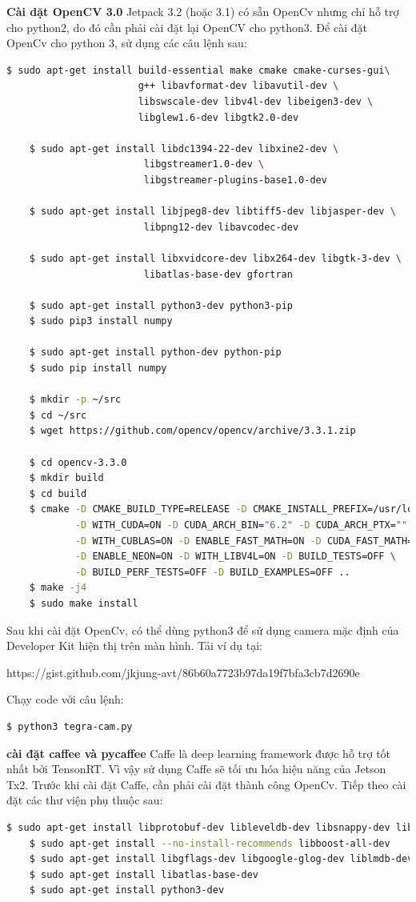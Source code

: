 \documentclass[a4paper]{report}
\begin{document}
\textbf{Cài dặt OpenCV 3.0}
Jetpack 3.2 (hoặc 3.1) có sẵn OpenCv nhưng chỉ hỗ trợ cho python2, do đó cần phải cài đặt lại OpenCV cho python3.
Để cài đặt OpenCv cho python 3, sử dụng các câu lệnh sau:
\begin{lstlisting}[language=bash, frame=single]
	$ sudo apt-get install build-essential make cmake cmake-curses-gui\
                       g++ libavformat-dev libavutil-dev \
                       libswscale-dev libv4l-dev libeigen3-dev \
                       libglew1.6-dev libgtk2.0-dev

	$ sudo apt-get install libdc1394-22-dev libxine2-dev \
						libgstreamer1.0-dev \
						libgstreamer-plugins-base1.0-dev

	$ sudo apt-get install libjpeg8-dev libtiff5-dev libjasper-dev \
						libpng12-dev libavcodec-dev

	$ sudo apt-get install libxvidcore-dev libx264-dev libgtk-3-dev \
						libatlas-base-dev gfortran

	$ sudo apt-get install python3-dev python3-pip
	$ sudo pip3 install numpy

	$ sudo apt-get install python-dev python-pip
	$ sudo pip install numpy

	$ mkdir -p ~/src
	$ cd ~/src
	$ wget https://github.com/opencv/opencv/archive/3.3.1.zip

	$ cd opencv-3.3.0
	$ mkdir build
	$ cd build
	$ cmake -D CMAKE_BUILD_TYPE=RELEASE -D CMAKE_INSTALL_PREFIX=/usr/local \
			-D WITH_CUDA=ON -D CUDA_ARCH_BIN="6.2" -D CUDA_ARCH_PTX="" \
			-D WITH_CUBLAS=ON -D ENABLE_FAST_MATH=ON -D CUDA_FAST_MATH=ON \
			-D ENABLE_NEON=ON -D WITH_LIBV4L=ON -D BUILD_TESTS=OFF \
			-D BUILD_PERF_TESTS=OFF -D BUILD_EXAMPLES=OFF ..
	$ make -j4
	$ sudo make install
\end{lstlisting}

Sau khi cài đặt OpenCv, có thể dùng python3 để sử dụng camera mặc định của Developer Kit hiện thị trên màn hình. Tải ví dụ tại: 
\begin{center}
\color{blue}
https://gist.github.com/jkjung-avt/86b60a7723b97da19f7bfa3cb7d2690e 
\end{center}
Chạy code với câu lệnh:
\begin{lstlisting}[language=bash, frame=single]
	$ python3 tegra-cam.py
\end{lstlisting}

\textbf{cài đặt caffee và pycaffee}
Caffe là deep learning framework được hỗ trợ tốt nhất bởi TensonRT. Vì vậy sử dụng Caffe sẽ tối ưu hóa hiệu năng của Jetson Tx2.
Trước khi cài đặt Caffe, cần phải cài đặt thành công OpenCv. Tiếp theo cài đặt các thư viện phụ thuộc sau:
\begin{lstlisting}[language=bash, frame=single]
	$ sudo apt-get install libprotobuf-dev libleveldb-dev libsnappy-dev libhdf5-serial-dev protobuf-compiler
	$ sudo apt-get install --no-install-recommends libboost-all-dev
	$ sudo apt-get install libgflags-dev libgoogle-glog-dev liblmdb-dev
	$ sudo apt-get install libatlas-base-dev
	$ sudo apt-get install python3-dev
\end{lstlisting}
\end{document}
